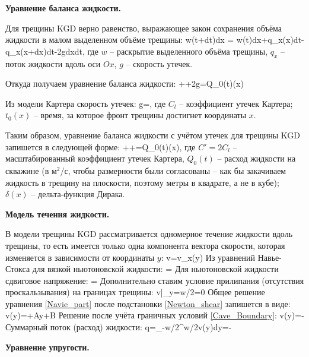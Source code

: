 \textbf{Уравнение баланса жидкости.}

Для трещины KGD верно равенство, выражающее закон сохранения объёма жидкости в малом выделенном объёме трещины:
\beq
w(t+dt)dx = w(t)dx+q_x(x)dt-q_x(x+dx)dt-2gdxdt,
\eeq
где $w$ -- раскрытие выделенного объёма трещины,
$q_x$ -- поток жидкости вдоль оси $Ox$,
$g$ -- скорость утечек.

Откуда получаем уравнение баланса жидкости:
\beq
{}++2g=Q_0(t)\delta(x)
\eeq

Из модели Картера \cite{karter} скорость утечек:
\beq
g=,
\eeq
где $C_l$ -- коэффициент утечек Картера;
$t_0(x)$ -- время, за которое фронт трещины достигнет координаты $x$.

Таким образом, уравнение баланса жидкости с учётом утечек для трещины KGD запишется в следующей форме:
\beq
{}++=Q_0(t)\delta(x),
\eeq
где $C'=2C_l$ -- масштабированный коэффициент утечек Картера,
$Q_0(t)$ -- расход жидкости на скважине (в м$^2$/с, чтобы размерности были согласованы -- как бы закачиваем жидкость в трещину на плоскости, поэтому метры в квадрате, а не в кубе);
$\delta(x)$ -- дельта-функция Дирака.

\textbf{Модель течения жидкости.}

В модели трещины KGD рассматривается одномерное течение жидкости вдоль трещины, то есть имеется только одна компонента вектора скорости, которая изменяется в зависимости от координаты $y$:
\beq
v=v_x(y)
\eeq
Из уравнений Навье-Стокса для вязкой ньютоновской жидкости:
\beq\label{Navie_part}
=
\eeq
Для ньютоновской жидкости сдвиговое напряжение:
\beq\label{Newton_shear}
\tau = \mu{}
\eeq
Дополнительно ставим условие прилипания (отсутствия проскальзывания) на границах трещины:
\beq\label{Cave_Boundary}
v|_{y=\pm w/2}=0
\eeq
Общее решение уравнения \eqref{Navie_part} после подстановки \eqref{Newton_shear} запишется в виде:
\beq
v(y)=+Ay+B
\eeq
Решение после учёта граничных условий \eqref{Cave_Boundary}:
\beq
v(y)=-
\eeq
Суммарный поток (расход) жидкости:
\beq
q=\int\limits_{-w/2}^{w/2}v(y)dy=-
\eeq

\textbf{Уравнение упругости.}

